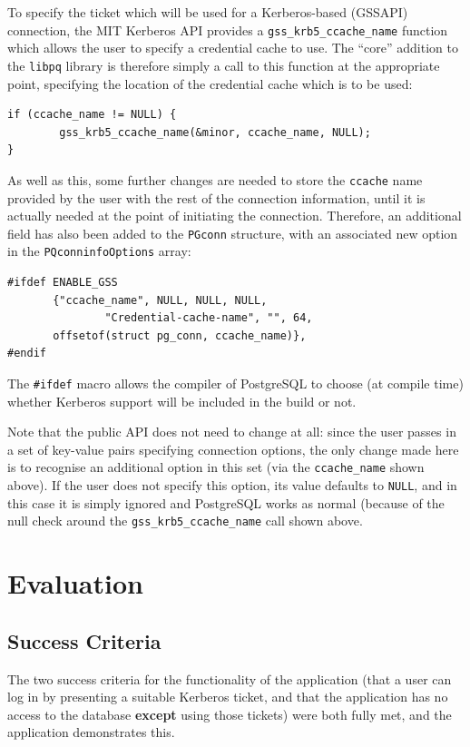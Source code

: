 \documentclass{article}
\begin{document}

To specify the ticket which will be used for a Kerberos-based (GSSAPI) connection, the MIT Kerberos API provides a \verb+gss_krb5_ccache_name+ function which allows the user to specify a credential cache to use. The ``core'' addition to the \texttt{libpq} library is therefore simply a call to this function at the appropriate point, specifying the location of the credential cache which is to be used:

\begin{verbatim}
if (ccache_name != NULL) {
        gss_krb5_ccache_name(&minor, ccache_name, NULL);
}
\end{verbatim}

As well as this, some further changes are needed to store the \texttt{ccache} name provided by the user with the rest of the connection information, until it is actually needed at the point of initiating the connection. Therefore, an additional field has also been added to the \texttt{PGconn} structure, with an associated new option in the \texttt{PQconninfoOptions} array:

\begin{verbatim}
#ifdef ENABLE_GSS
       {"ccache_name", NULL, NULL, NULL,
               "Credential-cache-name", "", 64,
       offsetof(struct pg_conn, ccache_name)},
#endif
\end{verbatim}

The \verb+#ifdef+ macro allows the compiler of PostgreSQL to choose (at compile time) whether Kerberos support will be included in the build or not.

Note that the public API does not need to change at all: since the user passes in a set of key-value pairs specifying connection options, the only change made here is to recognise an additional option in this set (via the \verb+ccache_name+ shown above). If the user does not specify this option, its value defaults to \texttt{NULL}, and in this case it is simply ignored and PostgreSQL works as normal (because of the null check around the \verb+gss_krb5_ccache_name+ call shown above.


\section{Evaluation}

\subsection{Success Criteria}
The two success criteria for the functionality of the application (that a user can log in by presenting a suitable Kerberos ticket, and that the application has no access to the database \textbf{except} using those tickets) were both fully met, and the application demonstrates this.
\end{document}
